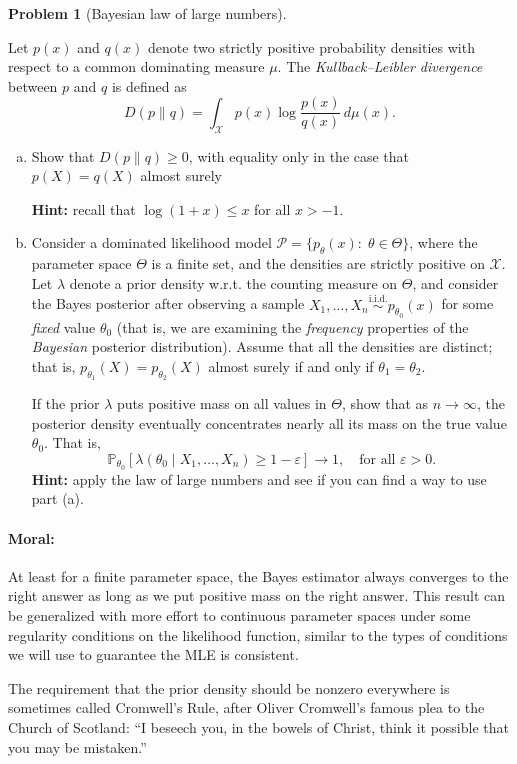 \documentclass{article}
\newcommand{\cP}{\mathcal{P}}
\newcommand{\cX}{\mathcal{X}}
\newcommand{\PP}{\mathbb{P}}
\newcommand{\simiid}{\overset{\text{i.i.d.}}{\sim}}
\newcommand{\ep}{\varepsilon}
\theoremstyle{definition}
\newtheorem{problem}{Problem}
\begin{document}
\begin{problem}[Bayesian law of large numbers]
\label{prob:bayes-lln}

Let $p(x)$ and $q(x)$ denote two strictly positive probability densities with respect to a common dominating measure $\mu$. The {\em Kullback--Leibler divergence} between $p$ and $q$ is defined as
\[
D(p \| q) = \int_{\cX} p(x) \log \frac{p(x)}{q(x)} \,d\mu(x).
\]


\begin{enumerate}[(a)]
\item Show that $D(p \| q) \geq 0$, with equality only in the case that $p(X) = q(X)$ almost surely 

{\bf Hint:} recall that $\log(1+x) \leq x$ for all $x>-1$.



\item Consider a dominated likelihood model $\cP = \{p_{\theta}(x):\; \theta\in \Theta\}$, where the parameter space $\Theta$ is a finite set, and the densities are strictly positive on $\cX$. Let $\lambda$ denote a prior density w.r.t. the counting measure on $\Theta$, and consider the Bayes posterior after observing a sample $X_1,\ldots,X_n \simiid p_{\theta_0}(x)$ for some {\em fixed} value $\theta_0$ (that is, we are examining the {\em frequency} properties of the {\em Bayesian} posterior distribution).  Assume that all the densities are distinct; that is, $p_{\theta_1}(X) = p_{\theta_2}(X)$ almost surely if and only if $\theta_1=\theta_2$.

If the prior $\lambda$ puts positive mass on all values in $\Theta$, show that as $n\to\infty$, the posterior density eventually concentrates nearly all its mass on the true value $\theta_0$. That is, 
\[
\PP_{\theta_0}\left[\lambda(\theta_0 \mid X_1,\ldots,X_n) \geq 1-\ep\right] \to 1, \quad \text{for all } \ep > 0.
\]
{\bf Hint:} apply the law of large numbers and see if you can find a way to use part (a).


\end{enumerate}

\paragraph{Moral:} At least for a finite parameter space, the Bayes estimator always converges to the right answer as long as we put positive mass on the right answer. This result can be generalized with more effort to continuous parameter spaces under some regularity conditions on the likelihood function, similar to the types of conditions we will use to guarantee the MLE is consistent. 

The requirement that the prior density should be nonzero everywhere is sometimes called Cromwell's Rule, after Oliver Cromwell's famous plea to the Church of Scotland: ``I beseech you, in the bowels of Christ, think it possible that you may be mistaken.''

\end{problem}
\end{document}
